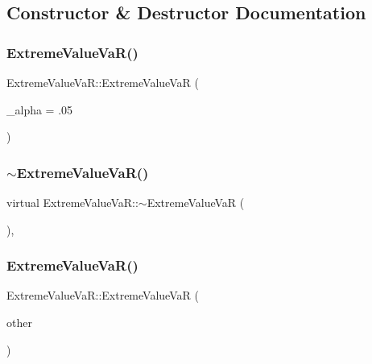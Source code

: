 \subsection{Constructor \& Destructor Documentation}
\hypertarget{classExtremeValueVaR_a0a85df72f4cd3d4e18b60e777e593c01}{}\label{classExtremeValueVaR_a0a85df72f4cd3d4e18b60e777e593c01} 
\subsubsection{\texorpdfstring{Extreme\+Value\+Va\+R()}{ExtremeValueVaR()}\hspace{0.1cm}{\footnotesize\ttfamily [1/2]}}
{\footnotesize\ttfamily Extreme\+Value\+Va\+R\+::\+Extreme\+Value\+VaR (\begin{DoxyParamCaption}\item[{double}]{\+\_\+alpha = {\ttfamily .05} }\end{DoxyParamCaption})}

\hypertarget{classExtremeValueVaR_a5079f1cf38bb19547f7d68695cf5e881}{}\label{classExtremeValueVaR_a5079f1cf38bb19547f7d68695cf5e881} 
\subsubsection{\texorpdfstring{$\sim$\+Extreme\+Value\+Va\+R()}{~ExtremeValueVaR()}}
{\footnotesize\ttfamily virtual Extreme\+Value\+Va\+R\+::$\sim$\+Extreme\+Value\+VaR (\begin{DoxyParamCaption}{ }\end{DoxyParamCaption})\hspace{0.3cm}{\ttfamily [inline]}, {\ttfamily [virtual]}}

\hypertarget{classExtremeValueVaR_a1c75fd9d6ec397b4b1ebc32225c4c41a}{}\label{classExtremeValueVaR_a1c75fd9d6ec397b4b1ebc32225c4c41a} 
\subsubsection{\texorpdfstring{Extreme\+Value\+Va\+R()}{ExtremeValueVaR()}\hspace{0.1cm}{\footnotesize\ttfamily [2/2]}}
{\footnotesize\ttfamily Extreme\+Value\+Va\+R\+::\+Extreme\+Value\+VaR (\begin{DoxyParamCaption}\item[{const \hyperlink{classExtremeValueVaR}{Extreme\+Value\+VaR} \&}]{other }\end{DoxyParamCaption})}



